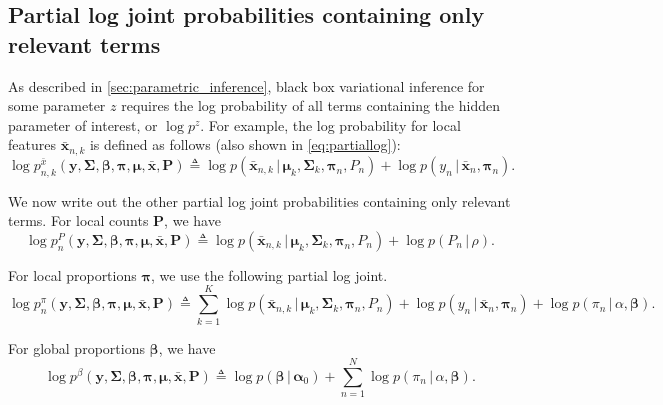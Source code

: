 \documentclass[twoside,11pt]{article}
\newcommand{\g}{\, | \,}
\begin{document}
\subsection{Partial log joint probabilities containing only relevant terms}
\label{app:partiallogjoints}
As described in \cref{sec:parametric_inference}, black box variational inference for some parameter $z$ requires the log probability of all terms containing the hidden parameter of interest, or $\log p^{z}$.  For example, the log probability for local features $\boldsymbol{\bar{x}}_{n,k}$ is defined as follows (also shown in \cref{eq:partiallog}):
\begin{equation}
    \log p^{\bar{x}}_{n,k}( \boldsymbol{y}, \boldsymbol{\Sigma}, \boldsymbol{\beta}, \boldsymbol{\pi}, \boldsymbol{\mu}, \boldsymbol{\bar{x}}, \boldsymbol{P}) \triangleq \log p(\boldsymbol{\bar{x}}_{n,k} \g \boldsymbol{\mu}_k, \boldsymbol{\Sigma}_k, \boldsymbol{\pi}_n, P_n) + \log p(y_{n} \g \boldsymbol{\bar{x}}_{n}, \boldsymbol{\pi}_n).
    \label{eq:partiallog_x}
\end{equation}

We now write out the other partial log joint probabilities containing only relevant terms.  For local counts $\boldsymbol{P}$, we have
\begin{equation}
    \log p^{P}_{n}( \boldsymbol{y}, \boldsymbol{\Sigma}, \boldsymbol{\beta}, \boldsymbol{\pi}, \boldsymbol{\mu}, \boldsymbol{\bar{x}}, \boldsymbol{P}) \triangleq \log p(\boldsymbol{\bar{x}}_{n,k} \g \boldsymbol{\mu}_k, \boldsymbol{\Sigma}_k, \boldsymbol{\pi}_n, P_n) + \log p(P_n \g \rho).
    \label{eq:partiallog_p}
\end{equation}

For local proportions $\boldsymbol{\pi}$, we use the following partial log joint.
\begin{equation}
    \log p^{\pi}_{n}( \boldsymbol{y}, \boldsymbol{\Sigma}, \boldsymbol{\beta}, \boldsymbol{\pi}, \boldsymbol{\mu}, \boldsymbol{\bar{x}}, \boldsymbol{P}) \triangleq 
    \sum_{k=1}^{K}\log p(\boldsymbol{\bar{x}}_{n,k} \g \boldsymbol{\mu}_k, \boldsymbol{\Sigma}_k, \boldsymbol{\pi}_n, P_n) +
    \log p(y_{n} \g \boldsymbol{\bar{x}}_{n}, \boldsymbol{\pi}_n) +
    \log p(\pi_{n} \g \alpha, \boldsymbol{\beta}).
    \label{eq:partiallog_pi}
\end{equation}

For global proportions $\boldsymbol{\beta}$, we have
\begin{equation}
    \log p^{\beta}( \boldsymbol{y}, \boldsymbol{\Sigma}, \boldsymbol{\beta}, \boldsymbol{\pi}, \boldsymbol{\mu}, \boldsymbol{\bar{x}}, \boldsymbol{P}) \triangleq 
    \log p(\boldsymbol{\beta} \g \boldsymbol{\alpha}_0) +
    \sum_{n=1}^N\log p(\pi_{n} \g \alpha, \boldsymbol{\beta}).
    \label{eq:partiallog_beta_param}
\end{equation}
\end{document}
